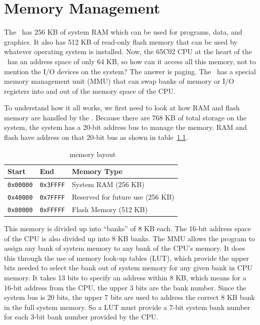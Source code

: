 \chapter{Memory Management}

The \jr\ has 256 KB of system RAM which can be used for programs, data, and graphics. It also has 512 KB of read-only flash memory that can be used by whatever operating system is installed. Now, the 65C02 CPU at the heart of the \jr\ has an address space of only 64 KB, so how can it access all this memory, not to mention the I/O devices on the system? The answer is paging. The \jr\ has a special memory management unit (MMU) that can swap banks of memory or I/O registers into and out of the memory space of the CPU.

To understand how it all works, we first need to look at how RAM and flash memory are handled by the \jr. Because there are 768 KB of total storage on the system, the system has a 20-bit address bus to manage the memory. RAM and flash have address on that 20-bit bus as shown in table~\ref{tab:memory}.

\begin{table}[ht]
	\begin{center}
		\begin{tabular}{| l | l | l |} \hline
			Start & End & Memory Type \\ \hline\hline
		  	\verb+0x00000+ & \verb+0x3FFFF+ & System RAM (256 KB)\\ \hline
			\verb+0x40000+ & \verb+0x7FFFF+ & Reserved for future use (256 KB)\\ \hline
		  	\verb+0x80000+ & \verb+0xFFFFF+ & Flash Memory (512 KB) \\ \hline
		\end{tabular}
	\end{center}
	\caption{\jr\ memory layout}
	\label{tab:memory}
\end{table}

This memory is divided up into ``banks'' of 8 KB each. The 16-bit address space of the CPU is also divided up into 8 KB banks. The MMU allows the program to assign any bank of system memory to any bank of the CPU's memory. It does this through the use of memory look-up tables (LUT), which provide the upper bits needed to select the bank out of system memory for any given bank in CPU memory. It takes 13 bits to specify an address within 8 KB, which means for a 16-bit address from the CPU, the upper 3 bits are the bank number. Since the system bus is 20 bits, the upper 7 bits are used to address the correct 8 KB bank in the full system memory. So a LUT must provide a 7-bit system bank number for each 3-bit bank number provided by the CPU.

